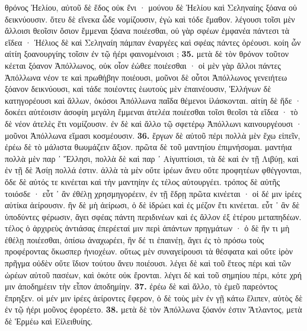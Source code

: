 \documentclass[a4paper, 11pt, oneside, polutonikogreek, german]{article}
\begin{document}
θρόνος Ἠελίου, αὐτοῦ δὲ ἕδος οὐκ ἔνι · μούνου δὲ Ἠελίου καὶ Σεληναίης ξόανα οὐ δεικνύουσιν. ὅτευ δὲ εἵνεκα ὧδε νομίζουσιν, ἐγὼ καὶ τόδε ἔμαθον. λέγουσι τοῖσι μὲν ἄλλοισι θεοῖσιν ὅσιον ἔμμεναι ξόανα ποιέεσθαι, οὐ γὰρ σφέων ἐμφανέα πάντεσι τὰ εἴδεα · Ἠέλιος δὲ καὶ Σεληναίη πάμπαν ἐναργέες καὶ σφέας πάντες ὁρέουσι. κοίη ὦν αἰτίη ξοανουργίης τοῖσιν ἐν τῷ ἠέρι φαινομένοισι ; \textbf{35.} μετὰ δὲ τὸν θρόνον τοῦτον κέεται ξόανον Ἀπόλλωνος, οὐκ οἷον ἐώθεε ποιέεσθαι · οἱ μὲν γὰρ ἄλλοι πάντες Ἀπόλλωνα νέον τε καὶ πρωθήβην ποιέουσι, μοῦνοι δὲ οὗτοι Ἀπόλλωνος γενειήτεω ξόανον δεικνύουσι, καὶ τάδε ποιέοντες ἑωυτοὺς μὲν ἐπαινέουσιν, Ἑλλήνων δὲ κατηγορέουσι καὶ ἄλλων, ὁκόσοι Ἀπόλλωνα παῖδα θέμενοι ἱλάσκονται. αἰτίη δὲ ἥδε · δοκέει αὐτέοισιν ἀσοφίη μεγάλη ἔμμεναι ἀτελέα ποιέεσθαι τοῖσι θεοῖσι τὰ εἴδεα · τὸ δὲ νέον ἀτελὲς ἔτι νομίζουσιν. ἐν δὲ καὶ ἄλλο τῷ σφετέρῳ Ἀπόλλωνι καινουργέουσι · μοῦνοι Ἀπόλλωνα εἵμασι κοσμέουσιν. \textbf{36.} ἔργων δὲ αὐτοῦ πέρι πολλὰ μὲν ἔχω εἰπεῖν, ἐρέω δὲ τὸ μάλιστα θωυμάζειν ἄξιον. πρῶτα δὲ τοῦ μαντηίου ἐπιμνήσομαι. μαντήια πολλὰ μὲν παρ ᾽ Ἕλλησι, πολλὰ δὲ καὶ παρ ᾽ Αἰγυπτίοισι, τὰ δὲ καὶ ἐν τῇ Λιβύῃ, καὶ ἐν τῇ δὲ Ἀσίῃ πολλά ἐστιν. ἀλλὰ τὰ μὲν οὔτε ἱρέων ἄνευ οὔτε προφητέων φθέγγονται, ὅδε δὲ αὐτός τε κινέεται καὶ τὴν μαντηίην ἐς τέλος αὐτουργέει. τρόπος δὲ αὐτῆς τοιόσδε · εὖτ ᾽ ἂν ἐθέλῃ χρησμηγορέειν, ἐν τῇ ἕδρῃ πρῶτα κινέεται · οἱ δέ μιν ἱρέες αὐτίκα ἀείρουσιν. ἢν δὲ μὴ ἀείρωσι, ὁ δὲ ἱδρώει καὶ ἐς μέζον ἔτι κινέεται. εὖτ ᾽ ἂν δὲ ὑποδύντες φέρωσιν, ἄγει σφέας πάντη περιδινέων καὶ ἐς ἄλλον ἐξ ἑτέρου μεταπηδέων. τέλος ὁ ἀρχιρεὺς ἀντιάσας ἐπερέεταί μιν περὶ ἁπάντων πρηγμάτων · ὁ δὲ ἤν τι μὴ ἐθέλῃ ποιέεσθαι, ὀπίσω ἀναχωρέει, ἢν δέ τι ἐπαινέῃ, ἄγει ἐς τὸ πρόσω τοὺς προφέροντας ὅκωσπερ ἡνιοχέων. οὕτως μὲν συναγείρουσι τὰ θέσφατα καὶ οὔτε ἱρὸν πρῆγμα οὐδὲν οὔτε ἴδιον τούτου ἄνευ ποιέουσι. λέγει δὲ καὶ τοῦ ἔτεος πέρι καὶ τῶν ὡρέων αὐτοῦ πασέων, καὶ ὁκότε οὐκ ἔρονται. λέγει δὲ καὶ τοῦ σημηίου πέρι, κότε χρή μιν ἀποδημέειν τὴν εἶπον ἀποδημίην. \textbf{37.} ἐρέω δὲ καὶ ἄλλο, τὸ ἐμεῦ παρεόντος ἔπρηξεν. οἱ μέν μιν ἱρέες ἀείροντες ἔφερον, ὁ δὲ τοὺς μὲν ἐν γῇ κάτω ἔλιπεν, αὐτὸς δὲ ἐν τῷ ἠέρι μοῦνος ἐφορέετο. \textbf{38.} μετὰ δὲ τὸν Ἀπόλλωνα ξόανόν ἐστιν Ἄτλαντος, μετὰ δὲ Ἑρμέω καὶ Εἰλειθυίης.
\end{document}
